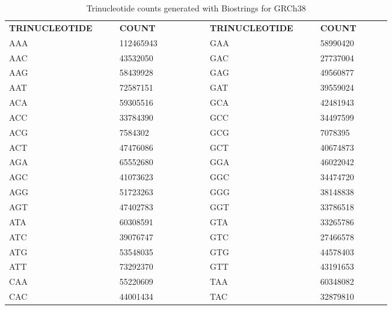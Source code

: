 \begin{table}[ht]
\caption[Trinucleotide counts of GRCh38]{Trinucleotide counts generated with Biostrings \cite{Pages2020} for GRCh38}\label{A:mmf:tab:tricounts}
\centering
{}
\begin{tabular}{|C{0.2\linewidth} | R{0.15\linewidth}| C{0.04\linewidth} |C{0.2\linewidth} | R{0.15\linewidth}|}
\toprule
 \hhline{|-|-|~|-|-|}
 \textbf{TRINUCLEOTIDE} & \textbf{COUNT} &  & \textbf{TRINUCLEOTIDE} & \textbf{COUNT}\\
 \hhline{|-|-|~|-|-|}

AAA & \num{ 112465943} &  & GAA & \num{ 58990420} \\
AAC & \num{ 43532050} &  & GAC & \num{ 27737004} \\
AAG & \num{ 58439928} &  & GAG & \num{ 49560877} \\
AAT & \num{ 72587151} &  & GAT & \num{ 39559024} \\
ACA & \num{ 59305516} &  & GCA & \num{ 42481943} \\
ACC & \num{ 33784390} &  & GCC & \num{ 34497599} \\
ACG & \num{ 7584302} &  & GCG & \num{ 7078395} \\
ACT & \num{ 47476086} &  & GCT & \num{ 40674873} \\
AGA & \num{ 65552680} &  & GGA & \num{ 46022042} \\
AGC & \num{ 41073623} &  &GGC & \num{ 34474720} \\
AGG & \num{ 51723263} &  &GGG & \num{ 38148838} \\
AGT & \num{ 47402783} &  &GGT & \num{ 33786518} \\
ATA & \num{ 60308591} &  &GTA & \num{ 33265786} \\
ATC & \num{ 39076747} &  &GTC & \num{ 27466578} \\
ATG & \num{ 53548035} &  &GTG & \num{ 44578403} \\
ATT & \num{ 73292370} &  &GTT & \num{ 43191653} \\
CAA & \num{ 55220609} &  &TAA & \num{ 60348082} \\
CAC & \num{ 44001434} &  &TAC & \num{ 32879810} \\

\end{tabular}
\end{table}
